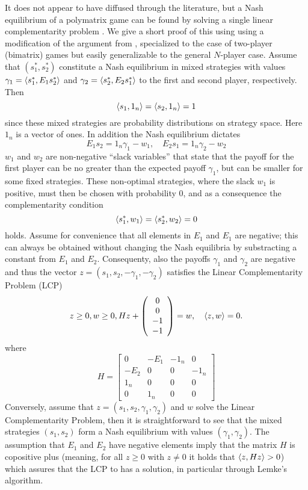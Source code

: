 It does not appear to have diffused through the literature, but a Nash equilibrium of a polymatrix game can be found by solving a single linear complementarity problem \citep{miller1991copositive}. We give a short proof of this using using a modification of the argument from \citep{miller1991copositive}, specialized to the case of two-player (bimatrix) games but easily generalizable to the general $N$-player case. Assume that $(s^*_1,s^*_2)$ constitute a Nash equilibrium in mixed strategies with values $\gamma_1 = \left \langle s^*_1,E_1 s^*_2 \right \rangle$ and  $\gamma_2 = \left \langle s^*_2,E_2 s^*_1 \right \rangle$ to the first and second player, respectively. Then
\[
  \left \langle s_1,1_n \right \rangle =
  \left \langle s_2,1_n \right \rangle =
  1
\]
since these mixed strategies are probability distributions on strategy space. Here $1_n$ is a vector of ones. In addition the Nash equilibrium dictates
\[
  E_1 s_2 = 1_n \gamma_1 - w_1
  ,\quad
  E_2 s_1 = 1_n \gamma_2  - w_2
\]
$w_1$ and $w_2$ are non-negative ``slack variables'' that state that the payoff for the first player can be no greater than the expected payoff $\gamma_1$, but can be smaller for some fixed strategies. These non-optimal strategies, where the slack $w_1$ is positive, must then be chosen with probability 0, and as a consequence the complementarity condition
\[
  \left \langle s^*_1,w_1 \right \rangle =   \left \langle s^*_2,w_2 \right \rangle = 0
\]
holds. Assume for convenience that all elements in $E_1$ and $E_1$ are negative; this can always be obtained without changing the Nash equilibria by substracting a constant from $E_1$ and $E_2$. Consequenty, also the payoffs $\gamma_1$ and $\gamma_2$ are negative and thus the vector $z = (s_1,s_2,-\gamma_1,-\gamma_2)$ satisfies the Linear Complementarity Problem (LCP)
\[
\label{eq:lcp}
  z \geq 0,
  w \geq 0 ,
  H
  z
  +
  \left(
    \begin{array}{c}
      0 \\
      0 \\
      -1 \\
      -1
    \end{array}
  \right)
  =
  w
  ,
  \quad
  \left \langle z,w \right \rangle = 0
  .
\]
where
\[
  H =
  \left[
    \begin{array}{cccc}
      0 & -E_1 & -1_n & 0 \\ -E_2 & 0 & 0 & -1_n \\
      1_n & 0 & 0 & 0 \\
      0 & 1_n & 0 & 0
    \end{array}
  \right]
\]
Conversely, assume that $z=(s_1,s_2,\gamma_1,\gamma_2)$ and $w$ solve the Linear Complementarity Problem, then it is straightforward to see that the mixed strategies $(s_1,s_2)$ form a Nash equilibrium with values $(\gamma_1,\gamma_2)$. The assumption that $E_1$ and $E_2$ have negative elements imply that the matrix $H$ is copositive plus (meaning, for all $z\geq0$ with $z\neq0$ it holds that $\left \langle z,Hz \right \rangle>0$) which assures that the LCP to has a solution, in particular through Lemke's algorithm.

